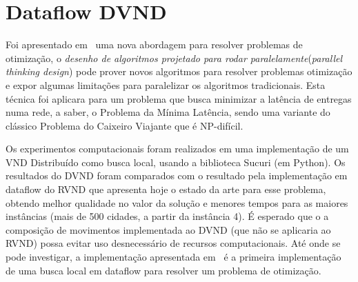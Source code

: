 \section{Dataflow DVND}

Foi apresentado em~\cite{df-dvnd2018} uma nova abordagem para resolver problemas de otimização, o \textit{desenho de algoritmos projetado para rodar paralelamente}(\textit{parallel thinking design}) pode prover novos algoritmos para resolver problemas otimização e expor algumas limitações para paralelizar os algoritmos tradicionais.
Esta técnica foi aplicara para um problema que busca minimizar a latência de entregas numa rede, a saber, o Problema da Mínima Latência, sendo uma variante do clássico Problema do Caixeiro Viajante que é NP-difícil.

Os experimentos computacionais foram realizados em uma implementação de um VND Distribuído como busca local, usando a biblioteca Sucuri (em Python).
Os resultados do DVND foram comparados com o resultado pela implementação em dataflow do RVND que apresenta hoje o estado da arte para esse problema, obtendo melhor qualidade no valor da solução e menores tempos para as maiores instâncias (mais de 500 cidades, a partir da instância 4).
É esperado que o a composição de movimentos implementada ao DVND (que não se aplicaria ao RVND) possa evitar uso desnecessário de recursos computacionais.
Até onde se pode investigar, a implementação apresentada em~\cite{df-dvnd2018} é a primeira implementação de uma busca local em dataflow para resolver um problema de otimização.
